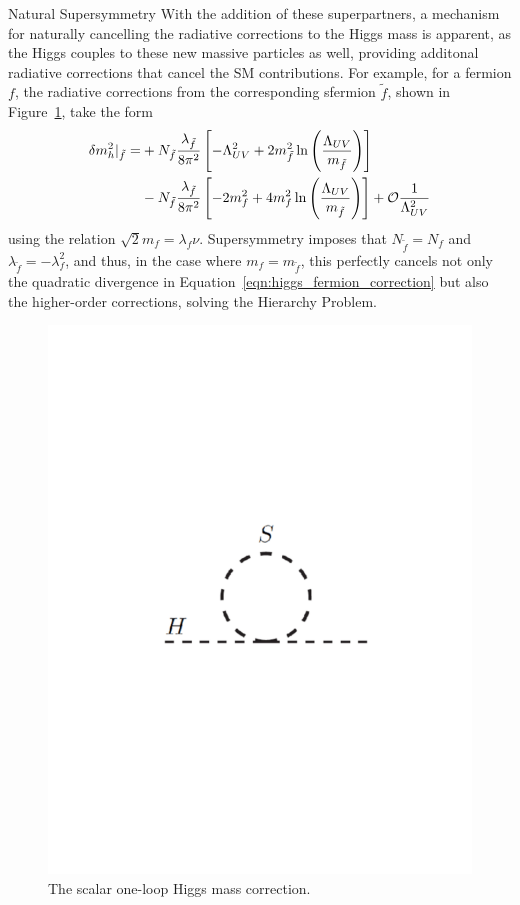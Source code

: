 \begin{section}{Natural Supersymmetry}
With the addition of these superpartners, a mechanism for naturally cancelling the radiative corrections to the Higgs mass is apparent, as the Higgs couples to these new massive particles as well, providing additonal radiative corrections that cancel the SM contributions.
For example, for a fermion $f$, the radiative corrections from the corresponding sfermion $\tilde{f}$, shown in Figure~\ref{fig:higgs_scalar_loop}, take the form
\begin{align}
\delta m_{h}^2|_{\tilde{f}} = &+N_{\tilde{f}}\frac{\lambda_{\tilde{f}}}{8\pi^2} \left[-\Lambda^2_{UV} + 2m_{\tilde{f}}^2\ln\left(\frac{\Lambda_{UV}}{m_{\tilde{f}}}\right)\right] \nonumber \\
                            &-N_{\tilde{f}}\frac{\lambda_{\tilde{f}}}{8\pi^2} \left[-2m_f^2 + 4m_f^2\ln\left(\frac{\Lambda_{UV}}{m_{\tilde{f}}}\right)\right] + \mathcal{O}\frac{1}{\Lambda^2_{UV}}
\end{align}
using the relation $\sqrt{2}m_f = \lambda_f\nu$.
Supersymmetry imposes that $N_{\tilde{f}} = N_f$ and $\lambda_{\tilde{f}} = -\lambda_f^2$, and thus, in the case where $m_f = m_{\tilde{f}}$, this perfectly cancels not only the quadratic divergence in Equation~\ref{eqn:higgs_fermion_correction} but also the higher-order corrections, solving the Hierarchy Problem.

\begin{figure}[tbp!]
\begin{center}
\includegraphics[angle=0,width=0.60\columnwidth]{fig/higgs_scalar_loop.pdf}
\end{center}
\caption{The scalar one-loop Higgs mass correction.}
\label{fig:higgs_scalar_loop}
\end{figure}


\end{section}
